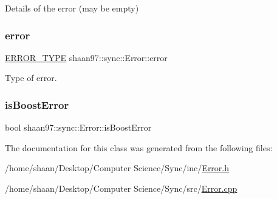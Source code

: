 Details of the error (may be empty) 

\mbox{\label{classshaan97_1_1sync_1_1_error_ab84e9af061261009996c1297c5cad5bd}} 
\subsubsection{\texorpdfstring{error}{error}}
{\footnotesize\ttfamily \hyperlink{namespaceshaan97_1_1sync_a69f4d5572314be52626f6a1c8ecc8db9}{E\+R\+R\+O\+R\+\_\+\+T\+Y\+PE} shaan97\+::sync\+::\+Error\+::error\hspace{0.3cm}{\ttfamily [private]}}



Type of error. 

\mbox{\label{classshaan97_1_1sync_1_1_error_afc11f4b04e46329a1317d157d4d92771}} 
\subsubsection{\texorpdfstring{is\+Boost\+Error}{isBoostError}}
{\footnotesize\ttfamily bool shaan97\+::sync\+::\+Error\+::is\+Boost\+Error\hspace{0.3cm}{\ttfamily [private]}}



The documentation for this class was generated from the following files\+:\begin{DoxyCompactItemize}
\item 
/home/shaan/\+Desktop/\+Computer Science/\+Sync/inc/\hyperlink{_error_8h}{Error.\+h}\item 
/home/shaan/\+Desktop/\+Computer Science/\+Sync/src/\hyperlink{_error_8cpp}{Error.\+cpp}\end{DoxyCompactItemize}
